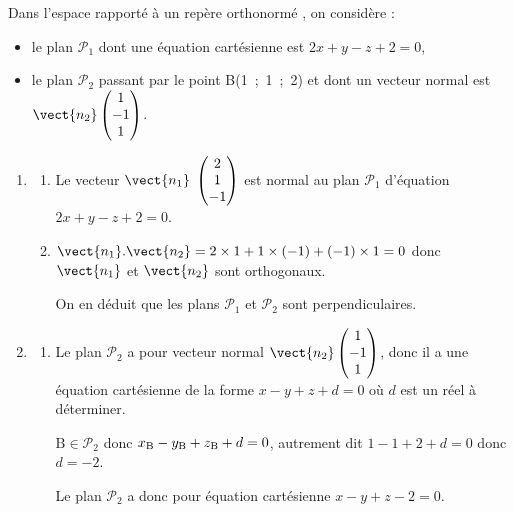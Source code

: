 \medskip

Dans l'espace rapporté à un repère orthonormé \Oijk, on considère :

\begin{itemize}
\item[$\bullet~~$]le plan $\mathcal{P}_1$ dont une équation cartésienne est $2x + y - z +2 = 0$,
\item[$\bullet~~$]le plan $\mathcal{P}_2$ passant par le point B(1~;~1~;~2) et dont un vecteur normal est $\vect{n_2}\begin{pmatrix}1\\-1\\1\end{pmatrix}$.
\end{itemize}



\begin{enumerate}
\item 
	\begin{enumerate}
		\item  Le vecteur $\vect{n_1}\;\begin{pmatrix} 2 \\1 \\ -1\end{pmatrix}$ est normal au plan $\mathcal{P}_1$ d'équation $2x+y-z+2=0$.
		
		\item 
		


$\vect{n_1}.\vect{n_2} = 2\times 1 + 1\times (-1) +(-1)\times 1 = 0$ donc $\vect{n_1}$ et $\vect{n_2}$ sont orthogonaux. 

On en déduit que les plans $\mathcal{P}_1$ et $\mathcal{P}_2$ sont perpendiculaires. 
	\end{enumerate}
\item 
	\begin{enumerate}
		\item 
Le plan $\mathcal{P}_2$ a pour vecteur normal $\vect{n_2}\begin{pmatrix}1\\-1\\1\end{pmatrix}$, donc il a une équation cartésienne de la forme $x-y+z+d=0$ où $d$ est un réel à déterminer.

$\text{B} \in \mathcal{P}_2$ donc $x_{\text B}-y_{\text B}+z_{\text B}+d=0$, autrement dit $1 - 1 +2 +d=0$ donc $d=-2$.

Le plan $\mathcal{P}_2$ a donc pour équation cartésienne $x-y+z-2=0$.


\end{enumerate}
\end{enumerate}
